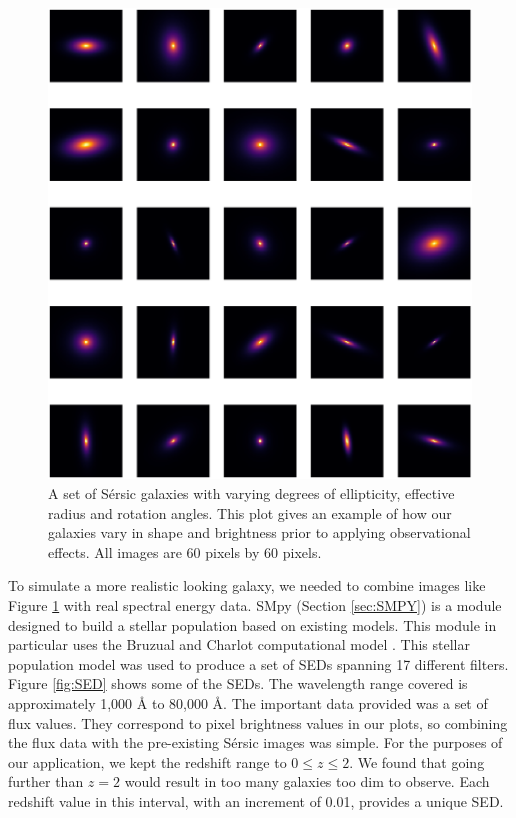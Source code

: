 \documentclass[fleqn,usenatbib]{mnras}
\begin{document}
\begin{figure}
	\includegraphics[width=\columnwidth]{Sersic2-v2.png}
    \caption{A set of S\'ersic galaxies with varying degrees of ellipticity, effective radius and rotation angles. This plot gives an example of how our galaxies vary in shape and brightness prior to applying observational effects. All images are 60 pixels by 60 pixels.}
    \label{fig:Sersic2}
\end{figure}

To simulate a more realistic looking galaxy, we needed to combine images like Figure \ref{fig:Sersic2} with real spectral energy data. SMpy (Section \ref{sec:SMPY}) is a module designed to build a stellar population based on existing models. This module in particular uses the Bruzual and Charlot computational model \citep{Duncan2014,Bruzual2003}. This stellar population model was used to produce a set of SEDs spanning 17 different filters. Figure \ref{fig:SED} shows some of the SEDs. The wavelength range covered is approximately 1,000 \si{\angstrom} to 80,000 \si{\angstrom}. The important data provided was a set of flux values. They correspond to pixel brightness values in our plots, so combining the flux data with the pre-existing S\'ersic images was simple. For the purposes of our application, we kept the redshift range to $0 \leq z \leq 2$. We found that going further than $z = 2$ would result in too many galaxies too dim to observe. Each redshift value in this interval, with an increment of 0.01, provides a unique SED.
\end{document}
